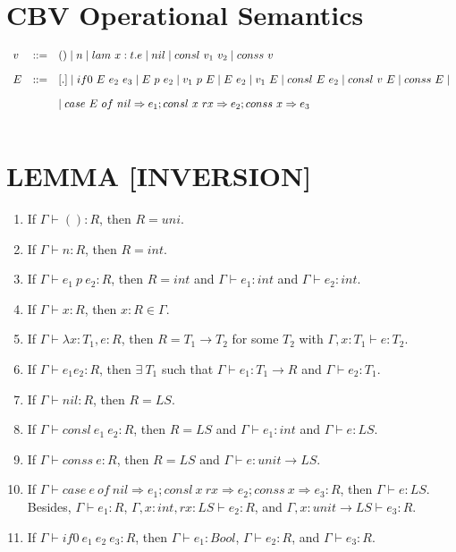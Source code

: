 \documentclass{article}
\begin{document}
\section{CBV Operational Semantics}

$\begin{array}{l c l}
  v    & ::= & () \mid n \mid lam~x:t.e \mid nil \mid consl~v_1~v_2 \mid conss~v\\[1em]
  E    & ::= & [.] \mid if0~E~e_2~e_3 \mid E~p~e_2 \mid v_1~p~E \mid E~e_2 \mid v_1~E \mid consl~E~e_2 \mid consl~v~E \mid conss~E \mid\\[1em] 
       &     &  \mid case~E~of~nil \Rightarrow e_1; consl~x~rx \Rightarrow e_2; conss~x \Rightarrow e_3\\[1em]
\end{array}$

\section{LEMMA [INVERSION]}

\begin{enumerate}
  \item If $\Gamma \vdash () : R$, then $R = uni$.
  \item If $\Gamma \vdash n : R$, then $R = int$.
  \item If $\Gamma \vdash e_1~p~e_2 : R$, then $R = int$ and $\Gamma \vdash e_1 : int$ and $\Gamma \vdash e_2 : int$.
  \item If $\Gamma \vdash x : R$, then $x : R \in \Gamma$.
  \item If $\Gamma \vdash \lambda x : T_1, e : R$, then $R = T_1 \rightarrow T_2$ for some $T_2$ with $\Gamma, x : T_1 \vdash e : T_2$.
  \item If $\Gamma \vdash e_1e_2 : R$, then $\exists~T_1$ such that $\Gamma \vdash e_1 : T_1 \rightarrow R$ and $\Gamma \vdash e_2 : T_1$.
  \item If $\Gamma \vdash nil : R$, then $R = LS$.
  \item If $\Gamma \vdash consl~e_1~e_2 : R$, then $R = LS$ and $\Gamma \vdash e_1 : int$ and $\Gamma \vdash e : LS$.
  \item If $\Gamma \vdash conss~e : R$, then $R = LS$ and $\Gamma \vdash e : unit \rightarrow LS$.
  \item If $\Gamma \vdash case~e~of~nil \Rightarrow e_1; consl~x~rx \Rightarrow e_2; conss~x \Rightarrow e_3 : R$, then $\Gamma \vdash e : LS$.\\ Besides, $\Gamma \vdash e_1 : R$, $\Gamma, x : int, rx : LS \vdash e_2: R$, and $\Gamma, x : unit \rightarrow LS \vdash e_3 : R$.
  \item If $\Gamma \vdash if0~e_1~e_2~e_3 : R$, then $\Gamma \vdash e_1 : Bool$, $\Gamma \vdash e_2 : R$, and $\Gamma \vdash e_3 : R$.
\end{enumerate}
\end{document}
